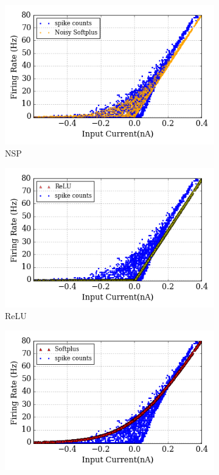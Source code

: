 \documentclass{article}
\begin{document}
	\begin{figure}[hb!]
		\centering
		\begin{subfigure}[hb]{0.32\textwidth}
			\includegraphics[width=\textwidth]{pics_iconip/6-5-3.png}
			\caption{NSP}
		\end{subfigure}
		\begin{subfigure}[hb]{0.32\textwidth}
			\includegraphics[width=\textwidth]{pics_iconip/6-5-2.png}
			\caption{ReLU}
		\end{subfigure}
		\begin{subfigure}[hb]{0.32\textwidth}
			\includegraphics[width=\textwidth]{pics_iconip/6-5-1.png}

\end{subfigure}
\end{figure}
\end{document}
